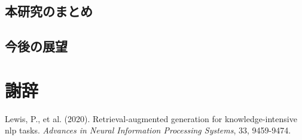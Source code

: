 \documentclass[12pt, a4paper]{jsarticle}
\begin{document}
\section{本研究のまとめ}
\label{sec:summary}

\section{今後の展望}
\label{sec:prospects}


\appendix
\chapter{謝辞}
\label{chap:acknowledgements}

\begin{thebibliography}{99}
  \raggedright
  Lewis, P., et al. (2020). Retrieval-augmented generation for knowledge-intensive nlp tasks. \textit{Advances in Neural Information Processing Systems}, 33, 9459-9474.

\end{thebibliography}
\end{document}
